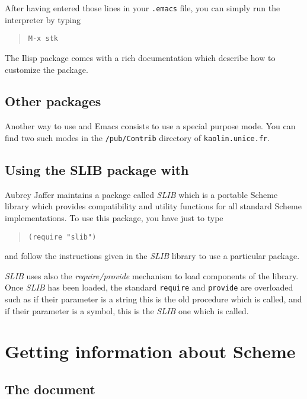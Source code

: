 After having entered those lines in your {\tt .emacs} file, you can simply
run the {\stk} interpreter by typing
\begin{quote}
\begin{verbatim}
M-x stk
\end{verbatim}
\end{quote}


The Ilisp package comes with a rich documentation which describe how to
customize the package. 

\subsection*{Other packages}

Another way to use {\stk} and Emacs consists to use a special purpose
{\stk} mode. You can find two such modes in the {\tt /pub/Contrib}
directory of {\tt kaolin.unice.fr}.

\subsection {Using the SLIB package with \stk}

Aubrey Jaffer maintains a package called {\em SLIB}
which is a portable Scheme library which provides compatibility and utility
functions for all standard Scheme implementations. To use this package, you
have just to type
\begin{quote}
\begin{verbatim}
(require "slib")
\end{verbatim}
\end{quote}
and follow the instructions given in the {\em SLIB} library to use a
particular package. 
\begin{note}
{\em SLIB} uses also the {\em require/provide} mechanism to load components
of the library. Once {\em SLIB} has been loaded, the standard {\stk} 
{\tt require} and {\tt provide}
are overloaded such as if their parameter
is a string this is the old {\stk} procedure which is called, and if their
parameter is a symbol, this is the {\em SLIB} one which is called.
\end{note}

\section{Getting information about Scheme}

\subsection{The {\rrrr} document}

